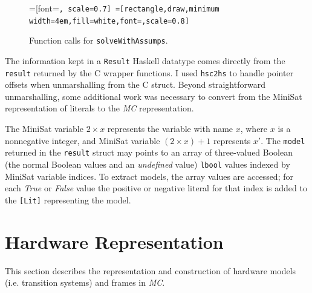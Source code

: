 \documentclass[12pt,a4paper,twoside,openright]{report}
\begin{document}
{{\begin{figure}[t]
\centering
{}=[font=\small\tt, scale=0.7]
=[rectangle,draw,minimum width=4em,fill=white,font=\small\tt,scale=0.8]
\caption{Function calls for {\tt solveWithAssumps}.}
\label{solveWithAssumps}
\end{figure}

The information kept in a \verb,Result, Haskell datatype comes directly from the
\verb,result, returned by the C wrapper functions.
I used \verb,hsc2hs, to handle pointer offsets
when unmarshalling from the C struct.
Beyond straightforward unmarshalling, some additional work was necessary
to convert from the MiniSat representation of literals to the \emph{MC} representation.

The MiniSat variable $2 \times x$ represents the variable with name $x$, where $x$ is a nonnegative
integer, and MiniSat variable $(2 \times x) + 1$ represents
$x'$.
The \verb,model, returned in the \verb,result, struct may
points to an array of three-valued Boolean (the normal Boolean values and an
\emph{undefined} value) \verb,lbool, values indexed by MiniSat variable indices.
To extract models, the array values are accessed; for each \emph{True} or \emph{False}
value the positive or negative literal for that index is added to the
\verb,[Lit], representing the model.

\section{Hardware Representation}
\label{impl:representation}
This section describes the representation and construction of hardware models (i.e.
transition systems) and frames in \emph{MC}.

}}
\end{document}

